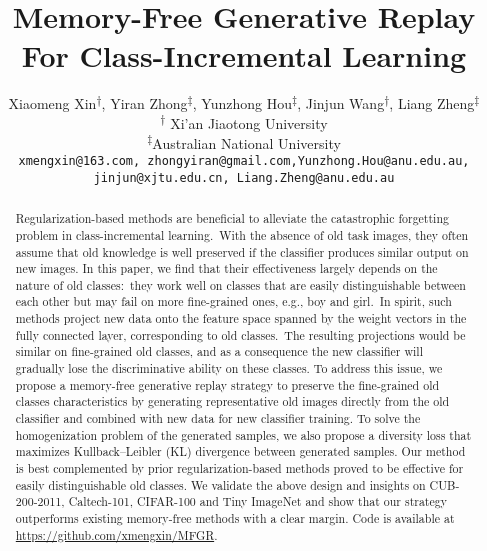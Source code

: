 \documentclass[10pt,twocolumn,letterpaper]{article}
\begin{document}
\title{Memory-Free Generative Replay For Class-Incremental Learning}

\author{Xiaomeng Xin\textsuperscript{$\dagger$}, Yiran Zhong\textsuperscript{$\ddagger$}, Yunzhong Hou\textsuperscript{$\ddagger$}, Jinjun Wang\textsuperscript{$\dagger$}, Liang Zheng\textsuperscript{$\ddagger$}\\
 \textsuperscript{$\dagger$} Xi'an Jiaotong University\\
 \textsuperscript{$\ddagger$}Australian National University\\
   {\tt\small xmengxin@163.com, zhongyiran@gmail.com,Yunzhong.Hou@anu.edu.au, jinjun@xjtu.edu.cn, Liang.Zheng@anu.edu.au}
}

\maketitle
\ificcvfinal\thispagestyle{empty}\fi

\begin{abstract}
Regularization-based methods are beneficial to alleviate the catastrophic forgetting problem in class-incremental learning.~With the absence of old task images, they often assume that old knowledge is well preserved if the classifier produces similar output on new images. 
In this paper, we find that their effectiveness largely depends on the nature of old classes:~they work well on classes that are easily distinguishable between each other but may fail on more fine-grained ones, e.g., boy and girl.~In spirit, such methods project new data onto the feature space spanned by the weight vectors in the fully connected layer, corresponding to old classes.~The resulting projections would be similar on fine-grained old classes, and as a consequence the new classifier will gradually lose the discriminative ability on these classes.
To address this issue, we propose a memory-free generative replay strategy to preserve the fine-grained old classes characteristics by generating representative old images directly from the old classifier and combined with new data for new classifier training. To solve the homogenization problem of the generated samples, we also propose a diversity loss that maximizes Kullback–Leibler (KL) divergence between generated samples.
Our method is best complemented by prior regularization-based methods proved to be effective for easily distinguishable old classes. We validate the above design and insights on CUB-200-2011, Caltech-101, CIFAR-100 and Tiny ImageNet and show that our strategy outperforms existing memory-free methods with a clear margin. Code is available at \url{https://github.com/xmengxin/MFGR}.
\end{abstract}
\end{document}
